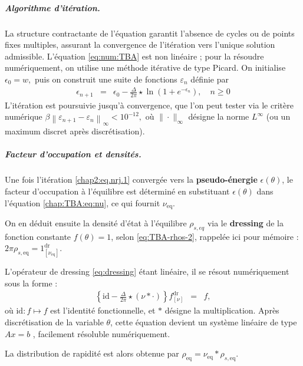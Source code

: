 \medskip
\subparagraph{Algorithme d’itération.}  
La structure contractante de l’équation garantit l’absence de cycles ou de points fixes multiples, assurant la convergence de l’itération vers l’unique solution admissible.
L’équation \eqref{eq:num:TBA} est non linéaire ; pour la résoudre numériquement, on utilise une méthode itérative de type Picard. On initialise
\(
  \epsilon_0 = w ,
\)
puis on construit une suite de fonctions \(\varepsilon_n\) définie par
\begin{eqnarray}
	\epsilon_{n+1} & = & \epsilon_0 -   \frac{\Delta}{2\pi} \star \ln \left( 1 + e^{-\epsilon_n} \right) ,\quad n\ge0 \label{chap2:eq.nrj.1}
\end{eqnarray}
L’itération est poursuivie jusqu’à convergence, que l’on peut tester via le critère numérique
\(
  \beta \left\| \varepsilon_{n+1} - \varepsilon_n \right\|_\infty < 10^{-12},
\)
où \(\|\cdot\|_\infty\) désigne la norme \(L^\infty\) (ou un maximum discret après discrétisation).


\medskip

\subparagraph{Facteur d’occupation et densités.}  
Une fois l’itération \eqref{chap2:eq.nrj.1} convergée vers la {\bf pseudo-énergie} $\epsilon(\theta)$, le facteur d’occupation à l’équilibre est déterminé en substituant $\epsilon(\theta)$ dans l’équation \eqref{chap:TBA:eq:nu}, ce qui fournit $\nu_{\!\mathrm{eq}}$.

\medskip
 
On en déduit ensuite la densité d'état à l'équilibre $\rho_{s,eq}$ via le {\bf dressing}  de la fonction constante $f(\theta) = 1$, selon \eqref{eq:TBA-rhos-2}, rappelée ici pour mémoire : $ 2\pi \rho_{s,\mathrm{eq}}  =  1^{\mathrm{dr}}_{[\nu_{\! \mathrm{eq}}]}$.

\medskip


L’opérateur de dressing \eqref{eq:dressing} étant linéaire, il se résout numériquement sous la forme :
\begin{eqnarray*}
	\left\{ \mathrm{id} - \frac{\Delta}{2\pi} \star ( \nu \ast \cdot ) \right\} f^{\mathrm{dr}}_{[\nu]} & = & f,\label{eq:TBA:rho_s:num}
\end{eqnarray*}
où $\mathrm{id} \colon f \mapsto f$ est l’identité fonctionnelle, et $\ast$ désigne la multiplication.
Après discrétisation de la variable $\theta$, cette équation devient un système linéaire de type $Ax=b$ , facilement résoluble numériquement.

La distribution de rapidité est alors obtenue par $\rho_{\!\mathrm{eq}} = \nu_{\!\mathrm{eq}} \ast \rho_{\! s,\mathrm{eq}}$.\\

